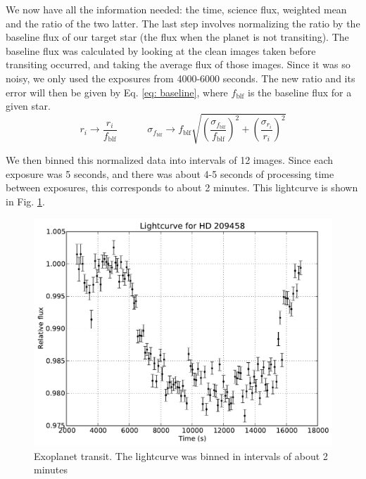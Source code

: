 \documentclass{aastex61}
\begin{document}
We now have all the information needed: the time, science flux, weighted mean and the ratio of the two latter. The last step involves normalizing the ratio by the baseline flux of our target star (the flux when the planet is not transiting). The baseline flux was calculated by looking at the clean images taken before transiting occurred, and taking the average flux of those images. Since it was so noisy, we only used the exposures from 4000-6000 seconds. The new ratio and its error will then be given by Eq. \eqref{eq: baseline}, where $f_{\text{blf}}$ is the baseline flux for a given star.
\begin{equation}\label{eq: baseline}
r_{i} \rightarrow \frac{r_{i}}{f_{\text{blf}}} \;\;\;\;\;\;\;\;\;\;\; \sigma_{ f_{\text{blf}}} \rightarrow f_{\text{blf}} \sqrt{\left( \frac{\sigma_{ f_{\text{blf}}}}{f_{\text{blf}}}\right) ^{2} + \left( \frac{\sigma_{ r_{i}}}{r_{i}}\right) ^{2}}
\end{equation}

We then binned this normalized data into intervals of 12 images. Since each exposure was 5 seconds, and there was about 4-5 seconds of processing time between exposures, this corresponds to about 2 minutes. This lightcurve is shown in Fig. \ref{fig: lightcurve}.

\begin{figure}[hbt!]
	\centering
	\includegraphics[scale = .50]{exo_lightcurve.pdf}
	\caption{Exoplanet transit. The lightcurve was binned in intervals of about 2 minutes}
	\label{fig: lightcurve}
\end{figure}
\end{document}
